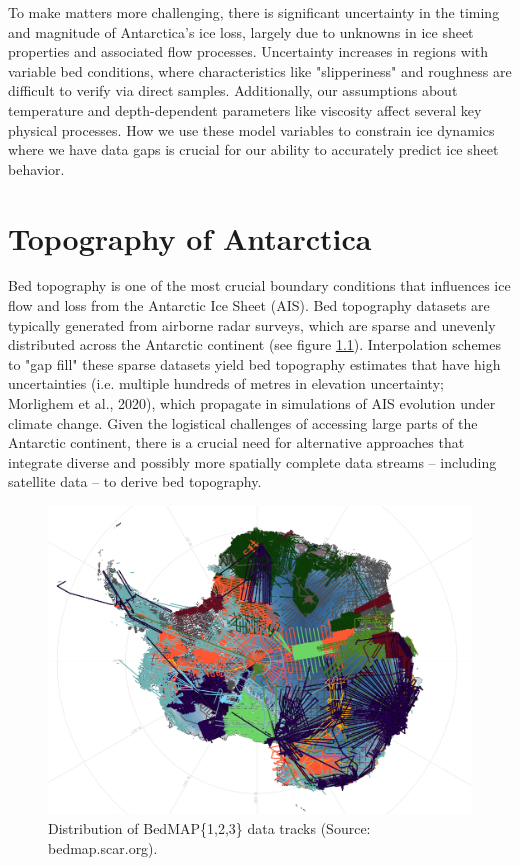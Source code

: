 To make matters more challenging, there is significant uncertainty in the timing and magnitude of Antarctica's ice loss, largely due to unknowns in ice sheet properties and associated flow processes\cite{IPCC}. Uncertainty increases in regions with variable bed conditions, where characteristics like "slipperiness" and roughness are difficult to verify via direct samples. Additionally, our assumptions about temperature and depth-dependent parameters like viscosity affect several key physical processes. How we use these model variables to constrain ice dynamics where we have data gaps is crucial for our ability to accurately predict ice sheet behavior\cite{Ockenden_2022}.

\chapter{Topography of Antarctica}\label{review}

Bed topography is one of the most crucial boundary conditions that influences ice flow and loss from the Antarctic Ice Sheet (AIS)\cite{Morlighem_2020}. Bed topography datasets are typically generated from airborne radar surveys, which are sparse and unevenly distributed across the Antarctic continent (see figure \ref{fig:BedMAP}). Interpolation schemes to "gap fill" these sparse datasets yield bed topography estimates that have high uncertainties (i.e. multiple hundreds of metres in elevation uncertainty; Morlighem et al., 2020), which propagate in simulations of AIS evolution under climate change\cite{Castleman_2022}. Given the logistical challenges of accessing large parts of the Antarctic continent, there is a crucial need for alternative approaches that integrate diverse and possibly more spatially complete data streams – including satellite data – to derive bed topography.
\begin{figure}[H]    %
    \includegraphics[scale=0.4]{bedmap.png}
    \caption{Distribution of BedMAP\{1,2,3\} data tracks (Source: bedmap.scar.org).}
    \label{fig:BedMAP}
\end{figure}

